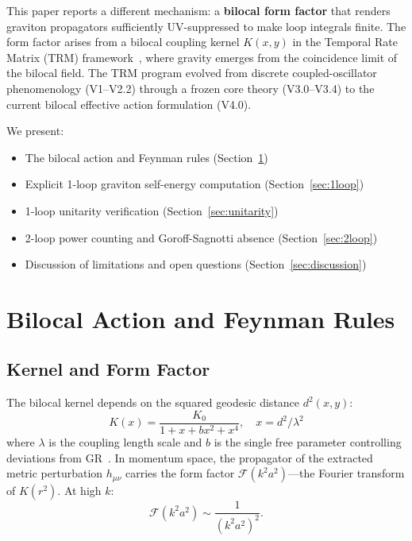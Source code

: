 \documentclass[aps,prd,reprint,nofootinbib]{revtex4-2}
\begin{document}
This paper reports a different mechanism: a \textbf{bilocal form factor} that renders graviton propagators sufficiently UV-suppressed to make loop integrals finite. The form factor arises from a bilocal coupling kernel $K(x,y)$ in the Temporal Rate Matrix (TRM) framework~\cite{TRM_V4_Paper, TRM_G6_Final}, where gravity emerges from the coincidence limit of the bilocal field. The TRM program evolved from discrete coupled-oscillator phenomenology (V1--V2.2) through a frozen core theory (V3.0--V3.4) to the current bilocal effective action formulation (V4.0).

We present:
\begin{itemize}
\item The bilocal action and Feynman rules (Section~\ref{sec:action})
\item Explicit 1-loop graviton self-energy computation (Section~\ref{sec:1loop})
\item 1-loop unitarity verification (Section~\ref{sec:unitarity})
\item 2-loop power counting and Goroff-Sagnotti absence (Section~\ref{sec:2loop})
\item Discussion of limitations and open questions (Section~\ref{sec:discussion})
\end{itemize}

\section{Bilocal Action and Feynman Rules}
\label{sec:action}

\subsection{Kernel and Form Factor}

The bilocal kernel depends on the squared geodesic distance $d^2(x,y)$:
\begin{equation}
K(x) = \frac{K_0}{1 + x + b x^2 + x^4},\quad x = d^2/\lambda^2
\label{eq:kernel}
\end{equation}
where $\lambda$ is the coupling length scale and $b$ is the single free parameter controlling deviations from GR~\cite{TRM_V4_Paper}. In momentum space, the propagator of the extracted metric perturbation $h_{\mu\nu}$ carries the form factor $\mathcal{F}(k^2 a^2)$---the Fourier transform of $K(r^2)$. At high $k$:
\begin{equation}
\mathcal{F}(k^2 a^2) \sim \frac{1}{(k^2 a^2)^2}.
\label{eq:formfactor}
\end{equation}
\end{document}
